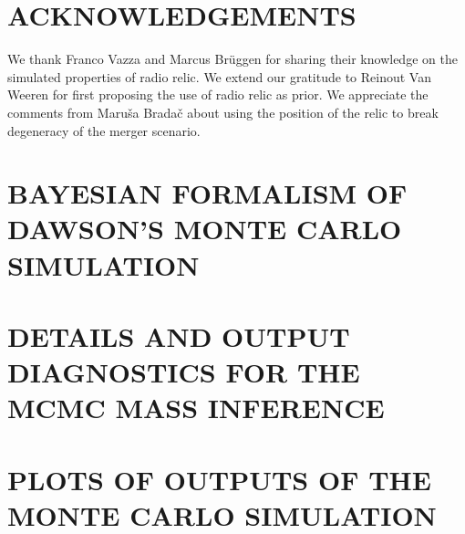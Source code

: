 \section{ACKNOWLEDGEMENTS}
We thank Franco Vazza and Marcus Br\"{u}ggen for sharing their knowledge on
the simulated properties of radio relic. We
extend our gratitude to Reinout Van Weeren for first proposing the use of
radio relic as prior. We appreciate the comments from Maru\v{s}a
Brada\v{c} about using the position of the relic to break degeneracy
of the merger scenario. 





\appendix

\section{BAYESIAN FORMALISM OF DAWSON'S MONTE CARLO SIMULATION}


\section{DETAILS AND OUTPUT DIAGNOSTICS FOR THE MCMC MASS INFERENCE}\label{app:MCMC}


\section{PLOTS OF OUTPUTS OF THE MONTE CARLO SIMULATION}


\bsp 
\label{lastpage} 


